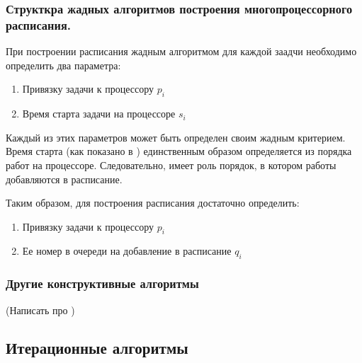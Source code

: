 \subsubsection{Структкра жадных алгоритмов построения многопроцессорного расписания.}
При построении расписания жадным алгоритмом для каждой заадчи необходимо определить два параметра:
\begin{enumerate}
    \item Привязку задачи к процессору $p_i$
    \item Время старта задачи на процессоре $s_i$
\end{enumerate}
Каждый из этих параметров может быть определен своим жадным критерием. Время старта (как показано в \cite{Kalashnikov_2004}) единственным образом определяется из порядка работ на процессоре. Следовательно, имеет роль порядок, в котором работы добавляются в расписание.

Таким образом, для построения расписания достаточно определить:
\begin{enumerate}
    \item Привязку задачи к процессору $p_i$
    \item Ее номер в очереди на добавление в расписание $q_i$
\end{enumerate}

\subsubsection{Другие конструктивные алгоритмы}
(Написать про \cite{heterog_review})

\subsection{Итерационные алгоритмы}

